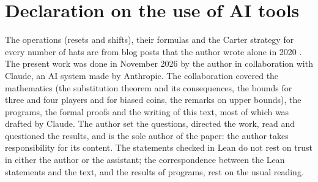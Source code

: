 \documentclass[11pt,a4paper]{article}
\theoremstyle{definition}
\theoremstyle{remark}
\begin{document}
\section*{Declaration on the use of AI tools}

The operations (resets and shifts), their formulas and the Carter
strategy for every number of hats are from blog posts that the author
wrote alone in 2020 \cite{R20}. The present work was done in November 2026 by the
author in collaboration with Claude, an AI system made by Anthropic. The
collaboration covered the mathematics (the substitution theorem and its
consequences, the bounds for three and four players and for biased
coins, the remarks on upper bounds), the programs, the formal proofs and
the writing of this text, most of which was drafted by Claude. The
author set the questions, directed the work, read and questioned the
results, and is the sole author of the paper: the author takes
responsibility for its content. The statements checked in Lean do not
rest on trust in either the author or the assistant; the correspondence
between the Lean statements and the text, and the results of programs,
rest on the usual reading.
\end{document}

